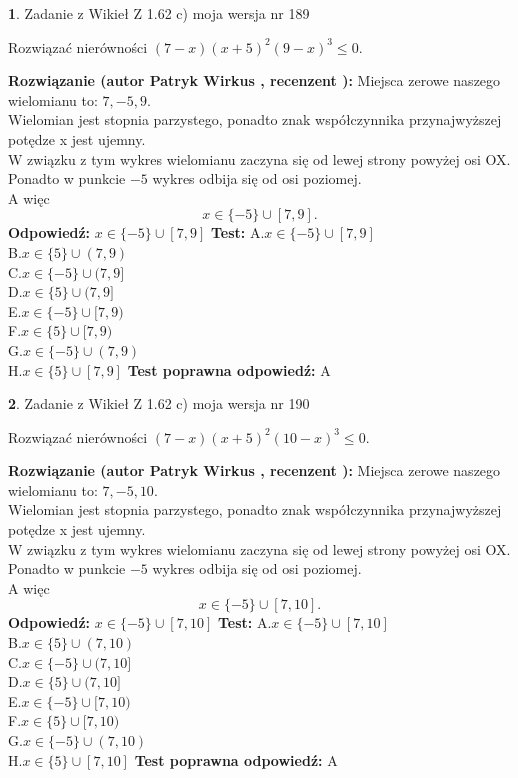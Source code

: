 \documentclass[12pt, a4paper]{article}
\theoremstyle{definition} %
\newtheorem{zad}{}
\newcommand{\zadStart}[1]{\begin{zad}#1\newline}
\newcommand{\zadStop}{\end{zad}}
\newcommand{\rozwStart}[2]{\noindent \textbf{Rozwiązanie (autor #1 , recenzent #2): }\newline}
\newcommand{\rozwStop}{\newline}
\newcommand{\odpStart}{\noindent \textbf{Odpowiedź:}\newline}
\newcommand{\odpStop}{\newline}
\newcommand{\testStart}{\noindent \textbf{Test:}\newline}
\newcommand{\testStop}{\newline}
\newcommand{\kluczStart}{\noindent \textbf{Test poprawna odpowiedź:}\newline}
\newcommand{\kluczStop}{\newline}
\begin{document}
\zadStart{Zadanie z Wikieł Z 1.62 c) moja wersja nr 189}

Rozwiązać nierówności $(7-x)(x+5)^{2}(9-x)^{3}\le0$.
\zadStop
\rozwStart{Patryk Wirkus}{}
Miejsca zerowe naszego wielomianu to: $7, -5, 9$.\\
Wielomian jest stopnia parzystego, ponadto znak współczynnika przy\linebreak najwyższej potędze x jest ujemny.\\ W związku z tym wykres wielomianu zaczyna się od lewej strony powyżej osi OX.\\
Ponadto w punkcie $-5$ wykres odbija się od osi poziomej.\\
A więc $$x \in \{-5\} \cup [7,9].$$
\rozwStop
\odpStart
$x \in \{-5\} \cup [7,9]$
\odpStop
\testStart
A.$x \in \{-5\} \cup [7,9]$\\
B.$x \in \{5\} \cup (7,9)$\\
C.$x \in \{-5\} \cup (7,9]$\\
D.$x \in \{5\} \cup (7,9]$\\
E.$x \in \{-5\} \cup [7,9)$\\
F.$x \in \{5\} \cup [7,9)$\\
G.$x \in \{-5\} \cup (7,9)$\\
H.$x \in \{5\} \cup [7,9]$
\testStop
\kluczStart
A
\kluczStop



\zadStart{Zadanie z Wikieł Z 1.62 c) moja wersja nr 190}

Rozwiązać nierówności $(7-x)(x+5)^{2}(10-x)^{3}\le0$.
\zadStop
\rozwStart{Patryk Wirkus}{}
Miejsca zerowe naszego wielomianu to: $7, -5, 10$.\\
Wielomian jest stopnia parzystego, ponadto znak współczynnika przy\linebreak najwyższej potędze x jest ujemny.\\ W związku z tym wykres wielomianu zaczyna się od lewej strony powyżej osi OX.\\
Ponadto w punkcie $-5$ wykres odbija się od osi poziomej.\\
A więc $$x \in \{-5\} \cup [7,10].$$
\rozwStop
\odpStart
$x \in \{-5\} \cup [7,10]$
\odpStop
\testStart
A.$x \in \{-5\} \cup [7,10]$\\
B.$x \in \{5\} \cup (7,10)$\\
C.$x \in \{-5\} \cup (7,10]$\\
D.$x \in \{5\} \cup (7,10]$\\
E.$x \in \{-5\} \cup [7,10)$\\
F.$x \in \{5\} \cup [7,10)$\\
G.$x \in \{-5\} \cup (7,10)$\\
H.$x \in \{5\} \cup [7,10]$
\testStop
\kluczStart
A
\kluczStop
\end{document}
